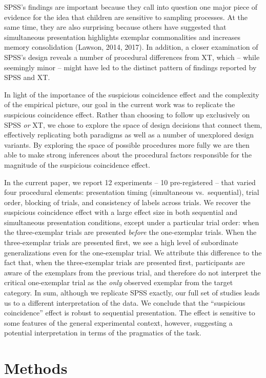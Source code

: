 \documentclass[english,floatsintext,man]{apa6}
\theoremstyle{definition}
\theoremstyle{definition}
\theoremstyle{definition}
\theoremstyle{remark}
\begin{document}
SPSS's findings are important because they call into question one major
piece of evidence for the idea that children are sensitive to sampling
processes. At the same time, they are also surprising because others
have suggested that simultaneous presentation highlights exemplar
commonalities and increases memory consolidation (Lawson, 2014, 2017).
In addition, a closer examination of SPSS's design reveals a number of
procedural differences from XT, which -- while seemingly minor -- might
have led to the distinct pattern of findings reported by SPSS and XT.

In light of the importance of the suspicious coincidence effect and the
complexity of the empirical picture, our goal in the current work was to
replicate the suspicious coincidence effect. Rather than choosing to
follow up exclusively on SPSS \emph{or} XT, we chose to explore the
space of design decisions that connect them, effectively replicating
both paradigms as well as a number of unexplored design variants. By
exploring the space of possible procedures more fully we are then able
to make strong inferences about the procedural factors responsible for
the magnitude of the suspicious coincidence effect.

In the current paper, we report 12 experiments -- 10 pre-registered --
that varied four procedural elements: presentation timing (simultaneous
vs.~sequential), trial order, blocking of trials, and consistency of
labels across trials. We recover the suspicious coincidence effect with
a large effect size in both sequential and simultaneous presentation
conditions, except under a particular trial order: when the
three-exemplar trials are presented \emph{before} the one-exemplar
trials. When the three-exemplar trials are presented first, we see a
high level of subordinate generalizations even for the one-exemplar
trial. We attribute this difference to the fact that, when the
three-exemplar trials are presented first, participants are aware of the
exemplars from the previous trial, and therefore do not interpret the
critical one-exemplar trial as the \emph{only} observed exemplar from
the target category. In sum, although we replicate SPSS exactly, our
full set of studies leads us to a different interpretation of the data.
We conclude that the \enquote{suspicious coincidence} effect is robust
to sequential presentation. The effect is sensitive to some features of
the general experimental context, however, suggesting a potential
interpretation in terms of the pragmatics of the task.

\section{Methods}\label{methods}
\end{document}
